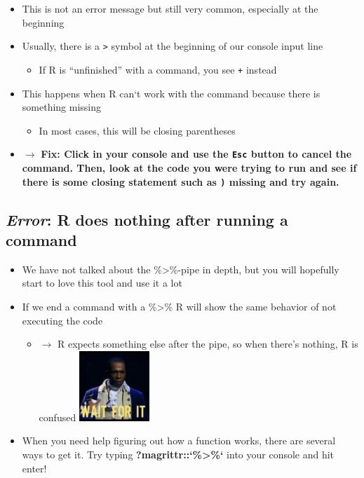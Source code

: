 \documentclass[
]{book}
\providecommand{\tightlist}{%
  \setlength{\itemsep}{0pt}\setlength{\parskip}{0pt}}
\begin{document}
\begin{itemize}
\tightlist
\item
  This is not an error message but still very common, especially at the beginning
\item
  Usually, there is a \texttt{\textgreater{}} symbol at the beginning of our console input line

  \begin{itemize}
  \tightlist
  \item
    If R is ``unfinished'' with a command, you see \texttt{+} instead
  \end{itemize}
\item
  This happens when R can`t work with the command because there is something missing

  \begin{itemize}
  \tightlist
  \item
    In most cases, this will be closing parentheses
  \end{itemize}
\item
  \(\rightarrow\) \textbf{Fix: Click in your console and use the \texttt{Esc} button to cancel the command. Then, look at the code you were trying to run and see if there is some closing statement such as \texttt{)} missing and try again.}
\end{itemize}

\subsection{\texorpdfstring{\emph{Error}: R does nothing after running a command}{Error: R does nothing after running a command}}\label{error-r-does-nothing-after-running-a-command-1}

\begin{itemize}
\tightlist
\item
  We have not talked about the \%\textgreater\%-pipe in depth, but you will hopefully start to love this tool and use it a lot
\item
  If we end a command with a \%\textgreater\% R will show the same behavior of not executing the code

  \begin{itemize}
  \tightlist
  \item
    \(\rightarrow\) R expects something else after the pipe, so when there's nothing, R is confused \includegraphics[width=\textwidth,height=1.04167in]{./img/waitforit.gif}
  \end{itemize}
\item
  When you need help figuring out how a function works, there are several ways to get it. Try typing \textbf{?magrittr::`\%\textgreater\%`} into your console and hit enter!
\end{itemize}
\end{document}
